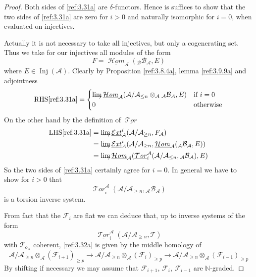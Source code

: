 \documentclass{amsproc}
\def \NN{{\mathbb N}}
\def\Ascr{{\mathcal A}}
\def\Bscr{{\mathcal B}}
\def\Escr{{\mathcal E}}
\def\Fscr{{\mathcal F}}
\def\Hscr{{\mathcal H}}
\def\Tscr{{\mathcal T}}
\def\HHom{\operatorname {\Hscr \mathit{om}}}
\def\HExt{\operatorname {\Escr \mathit{xt}}}
\def\HTor{\operatorname {\Tscr \mathit{or}}}
\def\Inj{\operatorname {Inj}}
\def\HHom{\operatorname {\Hscr \mathit{om}}}
\def\HExt{\operatorname {\Escr \mathit{xt}}}
\def\HTor{\operatorname {\Tscr \mathit{or}}}
\def\r{\rightarrow}
\let\oldtext\text
\def\text#1{\oldtext{\upshape #1}}
\theoremstyle{definition}
\theoremstyle{remark}
\def\dirlim{\mathop{\vtop{\baselineskip -100pt\lineskip -1pt\lineskiplimit 0pt
\setbox0\hbox{\upshape lim}\copy0\hbox to \wd0{\rightarrowfill}}}\limits}
\numberwithin{equation}{section}
\numberwithin{table}{section}
\numberwithin{figure}{section}
\begin{document}
\begin{proof} Both sides of \eqref{ref:3.31a} are $\delta$-functors. Hence
  is suffices to show that the two sides of \eqref{ref:3.31a} are zero for
  $i>0$ and naturally isomorphic for $i=0$, when evaluated on
  injectives. 

Actually it is not necessary to take all injectives, but only a
cogenerating set.  Thus we take for our injectives all
modules of the form 
\[
F=\underline{\HHom}_\Ascr({}_\Bscr\Bscr_\Ascr,E)
\]
where $E\in \Inj(\Ascr)$. Clearly by Proposition \ref{ref:3.8.4a},
lemma \ref{ref:3.9.9a} and
adjointness
\[
\text{RHS}\eqref{ref:3.31a}=
\begin{cases}
\dirlim \underline{\HHom}_\Ascr(\Ascr/\Ascr_{\le n}\otimes_\Ascr
{}_\Ascr\Bscr_\Ascr,E)&\text {if $i=0$}\\
0&\text{otherwise}
\end{cases}
\]
On the other hand by the definition of $\underline{\HTor}$
\begin{align*}
\text{LHS}\eqref{ref:3.31a}&= \dirlim
\underline{\HExt}^i_\Ascr(\Ascr/\Ascr_{\ge n} ,F_{\Ascr})\\
&=\dirlim
\underline{\HExt}^i_\Ascr(\Ascr/\Ascr_{\ge n} ,\underline{\HHom}_\Ascr
({}_\Ascr\Bscr_\Ascr,E))\\
&=\dirlim\underline{\HHom}_\Ascr(\underline{\HTor}^{\Ascr}_i(\Ascr/\Ascr_{\le
    n},{}_\Ascr\Bscr_\Ascr),E)
\end{align*}
So the two sides of \eqref{ref:3.31a} certainly agree for $i=0$. In general
we have to show  for $i>0$ that 
\begin{equation}
\label{ref:3.32a}
\underline{\HTor}^\Ascr_i(\Ascr/\Ascr_{\ge n},{}_\Ascr\Bscr_\Ascr)
\end{equation}
is a torsion inverse system.







From fact that  the $\Fscr_i$ are flat we can deduce that,
up to inverse systems of the form
\begin{equation}
\label{ref:3.33a}
\underline{\HTor}^\Ascr_i(\Ascr/\Ascr_{\ge n},\Tscr)
\end{equation}
with $\Tscr_{o_X}$ coherent, \eqref{ref:3.32a} is given by
the middle homology of
\begin{equation}
\label{ref:3.34a}
\Ascr/\Ascr_{\ge n}\otimes_\Ascr (\Fscr_{i+1})_{\ge p}
\r
\Ascr/\Ascr_{\ge n}\otimes_\Ascr (\Fscr_{i})_{\ge p}
\r
\Ascr/\Ascr_{\ge n}\otimes_\Ascr (\Fscr_{i-1})_{\ge p}
\end{equation}
By shifting if necessary we may assume that 
$\Fscr_{i+1}$, $\Fscr_i$, $\Fscr_{i-1}$ are $\NN$-graded. 








\end{proof}
\end{document}
